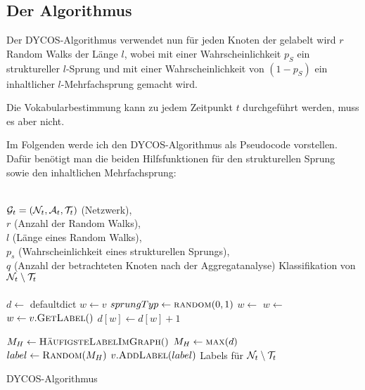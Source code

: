 


\subsection{Der Algorithmus}
Der DYCOS-Algorithmus verwendet nun für jeden Knoten der gelabelt wird
$r$ Random Walks der Länge $l$, wobei mit einer Wahrscheinlichkeit 
$p_S$ ein struktureller $l$-Sprung und mit einer Wahrscheinlichkeit
von $(1-p_S)$ ein inhaltlicher $l$-Mehrfachsprung gemacht wird.

Die Vokabularbestimmung kann zu jedem Zeitpunkt $t$ durchgeführt 
werden, muss es aber nicht.

Im Folgenden werde ich den DYCOS-Algorithmus als Pseudocode vorstellen.
Dafür benötigt man die beiden Hilfsfunktionen für den strukturellen
Sprung sowie den inhaltlichen Mehrfachsprung:

\begin{algorithm}[H]
    \begin{algorithmic}[1]
        \Require \\$\mathcal{G}_t = (\mathcal{N}_t, \mathcal{A}_t, \mathcal{T}_t)$ (Netzwerk),\\
                 $r$ (Anzahl der Random Walks),\\
                 $l$ (Länge eines Random Walks),\\
                 $p_s$ (Wahrscheinlichkeit eines strukturellen Sprungs),\\
                 $q$ (Anzahl der betrachteten Knoten nach der Aggregatanalyse)
        \Ensure  Klassifikation von $\mathcal{N}_t \setminus \mathcal{T}_t$\\
        \\

            \State $d \gets $ defaultdict
                \State $w \gets v$
                    \State $sprungTyp \gets \Call{random}{0, 1}$
                        \State $w \gets$ 
                    \Else
                        \State $w \gets$ 
                    \EndIf
                    \State $w \gets v.\Call{GetLabel}{ }$ 
                    \State $d[w] \gets d[w] + 1$
                \EndFor
            \EndFor

             
                \State $M_H \gets \Call{HäufigsteLabelImGraph}{ }$
            \Else
                \State $M_H \gets \Call{max}{d}$
            \EndIf
            \\
            \State {}
            \State $label \gets \Call{Random}{M_H}$ 
            \State $v.\Call{AddLabel}{label}$ 
        \EndFor
        \State \Return Labels für $\mathcal{N}_t \setminus \mathcal{T}_t$
    \end{algorithmic}
\caption{DYCOS-Algorithmus}
\label{alg:DYCOS}
\end{algorithm}
